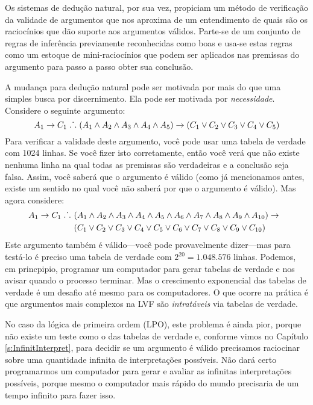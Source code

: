 Os sistemas de dedução natural, por sua vez, propiciam um método de verificação da validade de argumentos que nos aproxima de um entendimento de quais são os raciocínios que dão suporte aos argumentos válidos.
Parte-se de um conjunto de regras de inferência previamente reconhecidas como boas e usa-se estas regras como um estoque de mini-raciocínios que podem ser aplicados nas premissas do argumento para passo a passo obter sua conclusão.

A mudança para dedução natural pode ser motivada por mais do que uma simples busca por discernimento. Ela pode ser motivada por \emph{necessidade}. Considere o seguinte argumento:
$$A_1 \rightarrow C_1 \mathrel{\ldotp\dot{}\,\ldotp} (A_1 \wedge A_2 \wedge A_3 \wedge A_4 \wedge A_5) \rightarrow (C_1 \vee C_2 \vee C_3 \vee C_4 \vee C_5)$$
Para verificar a validade deste argumento, você   pode usar uma tabela de verdade com 1024 linhas. Se você fizer isto corretamente, então você verá que  não existe nenhuma linha na qual todas as premissas são verdadeiras e a conclusão seja falsa.  Assim, você saberá que o argumento é válido (como já mencionamos antes, existe um sentido no qual você não saberá por que o argumento é válido). Mas agora considere: 
\begin{align*}
A_1 \rightarrow C_1 \mathrel{\ldotp\dot{}\,\ldotp}\ & (A_1 \wedge A_2 \wedge A_3 \wedge A_4 \wedge A_5 \wedge A_6 \wedge A_7 \wedge A_8 \wedge A_9 \wedge A_{10}) \rightarrow \phantom{(}\\
&(C_1 \vee C_2 \vee C_3 \vee C_4 \vee C_5 \vee C_6 \vee C_7 \vee C_8 \vee C_9 \vee C_{10})
\end{align*}
Este argumento também é válido---você pode provavelmente dizer---mas para testá-lo é preciso uma tabela de verdade com
 $2^{20} = 1.048.576$ linhas. Podemos, em princpipio, programar um computador para gerar tabelas de verdade e nos avisar quando o processo terminar. Mas o crescimento exponencial das tabelas de verdade é um desafio até mesmo para os computadores. O que ocorre na prática é que argumentos mais complexos na LVF são \emph{intratáveis} via tabelas de verdade. 
 

No caso da lógica de primeira ordem (LPO), este problema é ainda pior, porque não existe um teste como o das tabelas de verdade e, conforme vimos no Capítulo \ref{s:InfinitInterpret}, para decidir se um argumento é válido precisamos raciocinar sobre uma quantidade infinita de interpretações possíveis.
Não dará certo programarmos um computador para gerar e avaliar as infinitas interpretações possíveis, porque mesmo o computador mais rápido do mundo precisaria de um tempo infinito para fazer isso. 

